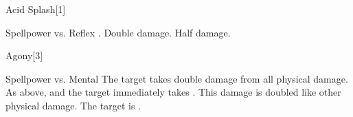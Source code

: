 \begin{spellsection}{Acid Splash}[1]
    \begin{spellheader}
    \end{spellheader}
    \begin{spellcontent}
        \begin{spelltargetinginfo}
        \end{spelltargetinginfo}
        \begin{spelleffects}
            \begin{spellattack}{Spellpower vs. Reflex}
                \spellsuccess {}.
                \spellcritical Double damage.
                \spellfailure Half damage.
            \end{spellattack}
        \end{spelleffects}
    \end{spellcontent}
    \begin{spellfooter}
        \spellnotes \physicalspellnotes
        \miscastrandom
    \end{spellfooter}
\end{spellsection}

\begin{spellsection}{Agony}[3]
    \begin{spellheader}
    \end{spellheader}
    \begin{spellcontent}
        \begin{spelltargetinginfo}
        \end{spelltargetinginfo}
        \begin{spelleffects}
            \begin{spellattack}{Spellpower vs. Mental}
                \spellsuccess The target takes double damage from all physical damage.
                \spellcritical As above, and the target immediately takes . This damage is doubled like other physical damage.
                \spellfailure The target is \sickened.
            \end{spellattack}
            \spelldur \durbrief
        \end{spelleffects}
    \end{spellcontent}
    \begin{spellfooter}
        \miscastrandom
    \end{spellfooter}
    \begin{spellaugments}
    \end{spellaugments}
\end{spellsection}

